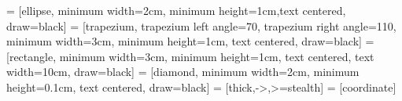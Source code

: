     \newcommand{\signature}{%
      \hfill
      \begin{minipage}{\textwidth}     
          \vspace*{2\baselineskip}
          \begin{center}
            \parbox{0.4\textwidth}{
            \centering
            {\footnotesize Ing. \insauthor}\\   
            \vspace*{-0.5\baselineskip}
            \rule{0.4\textwidth}{1pt}\\
            \vspace*{-0.25\baselineskip}
            {\footnotesize Nombre y firma del Alumno}
            \vspace*{1.25\baselineskip}
            }
          \end{center}
          \parbox{0.4\textwidth}{
          \centering
          {\footnotesize\inssupervisor}\\
          {\footnotesize\insadscription}\\   
          \vspace*{-0.5\baselineskip}
          \rule{0.4\textwidth}{1pt}\\
          \vspace*{-0.25\baselineskip}
          {\footnotesize Nombre y firma del Director de la idónea comunicación de resultados}
          \vspace*{1.25\baselineskip}
          }\hfill
          \parbox{0.4\textwidth}{
          \centering
          {\footnotesize\inscosupervisor}\\
          {\footnotesize\inscoadscription}\\   
          \vspace*{-0.5\baselineskip}
          \rule{0.4\textwidth}{1pt}\\
          \vspace*{-0.25\baselineskip}
          {\footnotesize Nombre y firma del Co-director de la idónea comunicación de resultados}
          \vspace*{1.25\baselineskip}
          }
          \vspace*{0.8\baselineskip}
      \end{minipage}
    }
    
     = [ellipse, minimum width=2cm, minimum height=1cm,text centered, draw=black]
     = [trapezium, trapezium left angle=70, trapezium right angle=110, minimum width=3cm, minimum height=1cm, text centered, draw=black]
     = [rectangle, minimum width=3cm, minimum height=1cm, text centered, text width=10cm, draw=black]
     = [diamond, minimum width=2cm, minimum height=0.1cm, text centered, draw=black]
     = [thick,->,>=stealth]
     = [coordinate]
